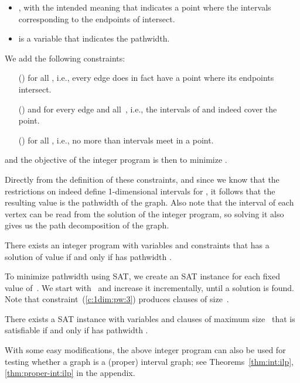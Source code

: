 \documentclass[runningheads]{llncs}
\newcounter{constr}
\newcommand{\constr}[1]{\noindent \refstepcounter{constr}\theconstr #1}
\begin{document}
\begin{itemize}
\item , with the intended meaning that 
	indicates a point where the 
	intervals corresponding to the endpoints of  intersect.
\item  is a variable that indicates the pathwidth.
\end{itemize}

We add the following constraints:
\begin{itemize}
\item[(\constr{\label{c:1dim:pw:1}})]
   for all , 
	i.e., every edge does in fact have
	a point where its endpoints intersect.
\item[(\constr{\label{c:1dim:pw:2}})] 
	 and  for every edge
	 and all~, i.e., the intervals of  and  indeed
	cover the point.
\item[(\constr{\label{c:1dim:pw:3}})]
  for all , i.e., no more than  intervals meet in a point.
\end{itemize}
and the objective of the integer program is then to minimize .

Directly from the definition of these constraints, and since we
know that the restrictions on  indeed define
1-dimensional intervals for , it follows that the resulting
value is the pathwidth of the graph.  Also note that the interval
of each vertex can be read from the solution of the integer
program, so solving it also gives us the path decomposition of
the graph.

\begin{theorem}
There exists an integer program with  variables
and constraints that has a solution of value  if and only
if  has pathwidth .
\end{theorem}

To minimize pathwidth using SAT, we create an SAT instance for each fixed value of~.
We start with~ and increase it incrementally,
until a solution is found.
Note that constraint~(\ref{c:1dim:pw:3}) produces 
clauses of size~.
\begin{theorem}
There exists a SAT instance with  variables
and  clauses
of maximum size~ that is satisfiable if and only
if  has pathwidth .
\label{thm:pw:sat}
\end{theorem}
\par
With some easy modifications, the above integer program can also be used 
for testing whether a graph is a (proper) interval graph; see 
Theorems~\ref{thm:int:ilp},\ref{thm:proper-int:ilp} 
in the appendix.

\fi
\end{document}
